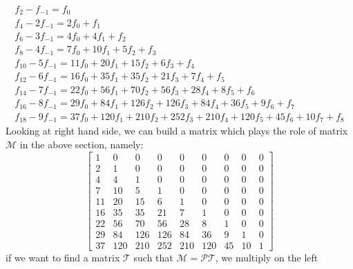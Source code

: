 \documentclass[a4paper,dottedtoc,headinclude,footinclude]{report} %
\theoremstyle{plain}
\begin{document}
    \begin{displaymath}
        \begin{array}{c}
            f_{2} - f_{-1}= f_{0}\\
            f_{4} -2 f_{-1} = 2 f_{0} + f_{1}\\
            f_{6} -3 f_{-1} = 4 f_{0} + 4 f_{1} + f_{2}\\
            f_{8} -4 f_{-1} = 7 f_{0} + 10 f_{1} + 5 f_{2} + f_{3}\\
            f_{10} -5 f_{-1} = 11 f_{0} + 20 f_{1} + 15 f_{2} + 6 f_{3} + f_{4}\\
            f_{12} -6 f_{-1} = 16 f_{0} + 35 f_{1} + 35 f_{2} + 21 f_{3} + 7 f_{4} + f_{5}\\
            f_{14} -7 f_{-1} = 22 f_{0} + 56 f_{1} + 70 f_{2} + 56 f_{3} + 28 f_{4} + 8 f_{5} + f_{6}\\
            f_{16} -8 f_{-1} = 29 f_{0} + 84 f_{1} + 126 f_{2} + 126 f_{3} + 84 f_{4} + 36 f_{5} + 9 f_{6} + f_{7}\\
            f_{18} -9 f_{-1} = 37 f_{0} + 120 f_{1} + 210 f_{2} + 252 f_{3} + 210 f_{4} + 120 f_{5} + 45 f_{6} + 10 f_{7} + f_{8}
            \end{array}
    \end{displaymath}
    Looking at right hand side, we can build a matrix which plays the role
    of matrix $\mathcal{M}$ in the above section, namely:
    \begin{displaymath}
        \left[\begin{array}{ccccccccc}
            1 & 0 & 0 & 0 & 0 & 0 & 0 & 0 & 0\\
            2 & 1 & 0 & 0 & 0 & 0 & 0 & 0 & 0\\
            4 & 4 & 1 & 0 & 0 & 0 & 0 & 0 & 0\\
            7 & 10 & 5 & 1 & 0 & 0 & 0 & 0 & 0\\
            11 & 20 & 15 & 6 & 1 & 0 & 0 & 0 & 0\\
            16 & 35 & 35 & 21 & 7 & 1 & 0 & 0 & 0\\
            22 & 56 & 70 & 56 & 28 & 8 & 1 & 0 & 0\\
            29 & 84 & 126 & 126 & 84 & 36 & 9 & 1 & 0\\
            37 & 120 & 210 & 252 & 210 & 120 & 45 & 10 & 1
            \end{array}\right]
    \end{displaymath}
    if we want to find a matrix $\mathcal{T}$ such that 
        $\mathcal{M}=\mathcal{P}\mathcal{T}$, we multiply on the left
\end{document}
